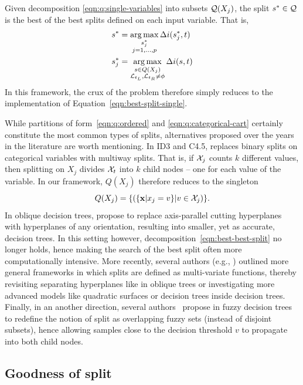 Given decomposition \ref{eqn:q:single-variables} into subsets ${\cal Q}(X_j)$,
the split $s^* \in {\cal Q}$ is the best of the best splits defined on each input
variable. That is,
\begin{align}
s^* &= \operatorname*{arg\,max}_{\substack{s^*_j\\ j=1, \dots, p}} \Delta i(s^*_j, t) \label{eqn:best-best-split}\\
s^*_j &= \operatorname*{arg\,max}_{\substack{s \in Q(X_j)\\ {\cal L}_{t_L}, {\cal L}_{t_R} \neq \phi}} \Delta i(s, t) \label{eqn:best-split-single}
\end{align}
In this framework, the crux of the problem therefore
simply reduces to the implementation of Equation~\ref{eqn:best-split-single}.

While partitions of form~\ref{eqn:q:ordered} and \ref{eqn:q:categorical-cart}
certainly constitute the most common types of splits, alternatives proposed
over the years in the literature are worth mentioning. In ID3 and C4.5,
\citet{quinlan:1986,quinlan:1993} replaces binary splits on categorical variables with
multiway splits. That is, if ${\cal X}_j$ counts $k$ different values, then
splitting on $X_j$ divides ${\cal X}_t$ into $k$ child nodes -- one for each
value of the variable. In our framework, $Q(X_j)$ therefore reduces to the singleton
\begin{equation}
Q(X_j) = \{ (\{\mathbf{x} | x_j = v\} | v \in {\cal X}_j) \}.
\end{equation}
In oblique decision trees, \citet{heath:1993} propose to
replace axis-parallel cutting hyperplanes with hyperplanes of any orientation,
resulting into smaller, yet as accurate, decision trees. In this setting
however, decomposition~\ref{eqn:best-best-split} no longer holds, hence making
the search of the best split often more computationally intensive. More
recently, several authors (e.g., \citep{gama:2004,criminisi:2013,botta:2013})
outlined more general frameworks in which splits are
defined as multi-variate functions, thereby revisiting separating hyperplanes
like in oblique trees or investigating more advanced models like qua\-dratic
surfaces or decision trees inside decision trees. Finally, in an another
direction, several authors~\citep{adamo:1980,yuan:1995,olaru:2003} propose in fuzzy
decision trees to redefine the notion of split as overlapping fuzzy sets
(instead of disjoint subsets), hence allowing samples close to the decision
threshold $v$ to propagate into both child nodes.

\subsection{Goodness of split}
\label{sec:3:criteria}

